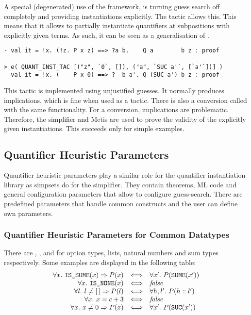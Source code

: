 A special (degenerated) use of the framework, is turning guess search off completely and
providing instantiations explicitly. The tactic  allows this. This means that
it allows to partially instantiate quantifiers at subpositions
with explicitly given terms. As such, it can be seen as 
a generalisation of . 
%
\begin{session}
\begin{verbatim}
- val it = !x. (!z. P x z) ==> ?a b.    Q a        b z : proof

> e( QUANT_INST_TAC [("z", `0`, []), ("a", `SUC a'`, [`a'`])] )
- val it = !x. (    P x 0) ==> ?  b a'. Q (SUC a') b z : proof
\end{verbatim}
\end{session}
% 
This tactic is implemented using unjustified guesses. It normally
produces implications, which is fine when used as a tactic. There is
also a conversion called  with the same
functionality. For a conversion, implications are
problematic. Therefore, the simplifier and Metis are used to prove
the validity of the explicitly given instantiations. This succeeds
only for simple examples.


\subsection{Quantifier Heuristic Parameters}\label{quantHeu_subsec_qps}

Quantifier heuristic parameters play a similar role for the quantifier
instantiation library as simpsets do for the simplifier. They contain
theorems, ML code and general configuration parameters that allow to configure
guess-search. There are predefined parameters that handle
common constructs and the user can define own parameters.

\subsubsection{Quantifier Heuristic Parameters for Common Datatypes}

There are , ,  and  for option types, lists, 
natural numbers and sum types respectively. 
Some examples are displayed in the following table:
%
\[\begin{array}{r@{\quad \Longleftrightarrow \quad}l}
\forall x.\ \holtxt{IS\_SOME}(x) \Rightarrow P(x) & \forall x'.\ P (\holtxt{SOME}(x')) \\
\forall x.\ \holtxt{IS\_NONE}(x)& \textit{false} \\
\forall l.\ l \neq [\,] \Rightarrow P(l)& \forall h, l'.\ P(h::l')  \\
\forall x.\ x = c + 3& \textit{false} \\
\forall x.\ x \neq 0 \Rightarrow P(x)& \forall x'.\ P(\holtxt{SUC}(x')) 
\end{array}\]

